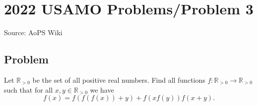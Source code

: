 \documentclass[12pt]{article}
\begin{document}
\section*{{2022 USAMO Problems/Problem 3}}
Source: AoPS Wiki

\subsection*{Problem}
Let $\mathbb{R}_{>0}$ be the set of all positive real numbers. Find all functions $f:\mathbb{R}_{>0} \to \mathbb{R}_{>0}$ such that for all $x,y\in \mathbb{R}_{>0}$ we have \[f(x) = f(f(f(x)) + y) + f(xf(y)) f(x+y).\]
\end{document}
